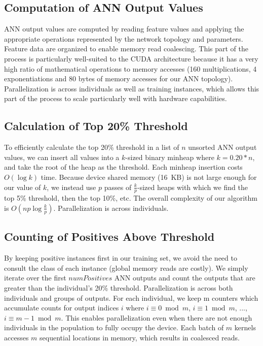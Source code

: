\documentclass[11pt]{article}       %
\begin{document}
\subsection{Computation of ANN Output Values} \label{implementation}
ANN output values are computed by reading feature values and applying the appropriate operations represented by the network topology and parameters. Feature data are organized to enable memory read coalescing. This part of the process is particularly well-suited to the CUDA architecture because it has a very high ratio of mathematical operations to memory accesses (160 multiplications, 4 exponentiations and 80 bytes of memory accesses for our ANN topology). Parallelization is across individuals as well as training instances, which allows this part of the process to scale particularly well with hardware capabilities.

\subsection{Calculation of Top 20\% Threshold} \label{implementation}
To efficiently calculate the top 20\% threshold in a list of $n$ unsorted ANN output values, we can insert all values into a $k$-sized binary minheap where $k = 0.20 * n$, and take the root of the heap as the threshold. Each minheap insertion costs $O(\log k)$ time. Because device shared memory (16~KB) is not large enough for our value of $k$, we instead use $p$ passes of $\frac{k}{p}$-sized heaps with which we find the top 5\% threshold, then the top 10\%, etc. The overall complexity of our algorithm is $O(np \log \frac{k}{p})$. Parallelization is across individuals.

\subsection{Counting of Positives Above Threshold} \label{implementation}
By keeping positive instances first in our training set, we avoid the need to consult the class of each instance (global memory reads are costly). We simply iterate over the first $numPositives$ ANN outputs and count the outputs that are greater than the individual's 20\% threshold. Parallelization is across both individuals and groups of outputs. For each individual, we keep m counters which accumulate counts for output indices $i$ where $i \equiv 0 \bmod{m}$, $i \equiv 1 \bmod{m}$, ..., $i \equiv m - 1 \bmod{m}$. This enables parallelization even when there are not enough individuals in the population to fully occupy the device. Each batch of $m$ kernels accesses $m$ sequential locations in memory, which results in coalesced reads.
\end{document}
